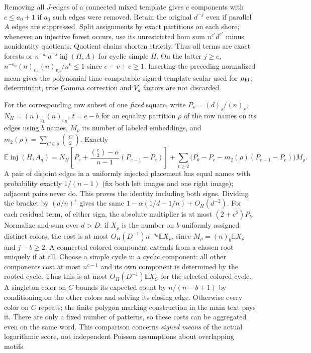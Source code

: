 Removing all $J$-edges of a connected mixed template gives $c$ components with $c\le a_0+1$ if $a_0$ such edges were removed. Retain the original $d^{-j}$ even if parallel $A$ edges are suppressed. Split assignments by exact partitions on each shore; whenever an injective forest occurs, use its unrestricted hom sum $n^{c'}d^{e'}$ minus nonidentity quotients. Quotient chains shorten strictly. Thus all terms are exact forests or $n^{-a_0}d^{-j}\operatorname{inj}(H,A)$ for cyclic simple $H$. On the latter $j\ge e$, $n^{-a_0}(n)_{v_L}(n)_{v_R}/n^e\le1$ since $e-v+c\ge1$. Inserting the preceding normalized mean gives the polynomial-time computable signed-template scalar used for $\mu_{\rm hi}$; determinant, true Gamma correction and $V_d$ factors are not discarded.

For the corresponding row subset of one \emph{fixed} square, write $P_s=(d)_s/(n)_s$, $N_H=(n)_{v_L}(n)_{v_R}$, $t=e-b$ for an equality partition $\rho$ of the row names on its edges using $b$ names, $M_\rho$ its number of labeled embeddings, and $m_2(\rho)=\sum_{C\in\rho}\binom{|C|}{2}$. Exactly
\[
 \mathbb E\operatorname{inj}(H,A_d)=
 N_H\left[P_e+\frac{\binom e2-\alpha}{n-1}(P_{e-1}-P_e)\right]
 +\sum_{t\ge2}\bigl(P_b-P_e-m_2(\rho)(P_{e-1}-P_e)\bigr)M_\rho.
\]
A pair of disjoint edges in a uniformly injected placement has equal names with probability exactly $1/(n-1)$ (fix both left images and one right image); adjacent pairs never do. This proves the identity including both signs. Dividing the bracket by $(d/n)^e$ gives the same $1-\alpha(1/d-1/n)+O_H(d^{-2})$. For each residual term, of either sign, the absolute multiplier is at most $(2+e^2)P_b$. Normalize and sum over $d>D$: if $X_\rho$ is the number on $b$ uniformly assigned distinct colors, the cost is at most $O_H(D^{-1})n^{-a_0}\mathbb E X_\rho$, since $M_\rho=(n)_b\mathbb E X_\rho$ and $j-b\ge2$. A connected colored component extends from a chosen root uniquely if at all. Choose a simple cycle in a cyclic component: all other components cost at most $n^{c-1}$ and its own component is determined by the rooted cycle. Thus this is at most $O_H(D^{-1})\mathbb E X_C$ for the selected colored cycle. A singleton color on $C$ bounds its expected count by $n/(n-b+1)$ by conditioning on the other colors and solving its closing edge. Otherwise every color on $C$ repeats; the finite polygon marking construction in the main text pays it. There are only a fixed number of patterns, so these costs can be aggregated even on the same word. This comparison concerns \emph{signed means} of the actual logarithmic score, not independent Poisson assumptions about overlapping motifs.
